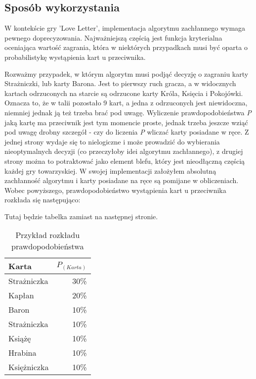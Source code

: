 \subsection{Sposób wykorzystania}

W kontekście gry 'Love Letter', implementacja algorytmu zachłannego wymaga pewnego doprecyzowania. Najważniejszą częścią jest funkcja kryterialna oceniająca wartość zagrania, która w niektórych przypadkach musi być oparta o probabilistykę wystąpienia kart u przeciwnika. 

Rozważmy przypadek, w którym algorytm musi podjąć decyzję o zagraniu karty Strażniczki, lub karty Barona. Jest to pierwszy ruch gracza, a w widocznych kartach odrzuconych na starcie są odrzucone karty Króla, Księcia i Pokojówki. Oznacza to, że w talii pozostało 9 kart, a jedna z odrzuconych jest niewidoczna, niemniej jednak ją też trzeba brać pod uwagę. Wyliczenie prawdopodobieństwa \textit{P} jaką kartę ma przeciwnik jest tym momencie proste, jednak trzeba jeszcze wziąć pod uwagę drobny szczegół - czy do liczenia \textit{P} wliczać karty posiadane w ręce. Z jednej strony wydaje się to nielogiczne i może prowadzić do wybierania nieoptymalnych decyzji (co przeczyłoby idei algorytmu zachłannego), z drugiej strony można to potraktować jako element blefu, który jest nieodłączną częścią każdej gry towarzyskiej. W swojej implementacji założyłem absolutną zachłanność algorytmu i karty posiadane na ręce są pomijane w obliczeniach. 
Wobec powyższego, prawdopodobieństwo wystąpienia kart u przeciwnika rozkłada się następująco:


\begin{center}
	Tutaj będzie tabelka zamiast na następnej stronie. %
\end{center}

\clearpage
\begin{table}[t]
	\caption{Przykład rozkładu prawdopodobieństwa}
	\centering
		\begin{tabular}{|l|r|}
			\hline
			Karta & $P_{(Karta)}$	\\ \hline
			Strażniczka & 30\% 			\\ \hline
			Kapłan & 20\% 				\\ \hline
			Baron & 10\% 				\\ \hline
			Strażniczka & 10\% 			\\ \hline
			Książę & 10\% 				\\ \hline
			Hrabina & 10\% 				\\ \hline
			Księżniczka & 10\% 			\\ \hline
		\end{tabular}
\end{table}

